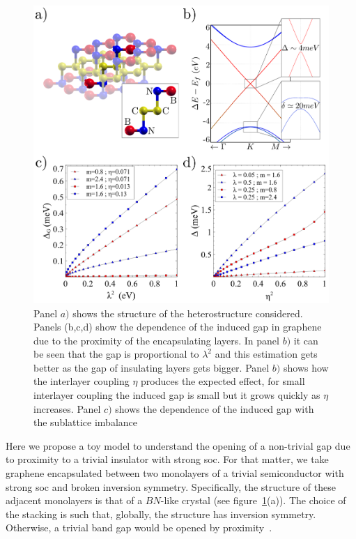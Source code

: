 \begin{figure}[hbt]
 \centering
  \includegraphics{chapter04/figures/encapsulated.png}
\caption{Panel $a)$ shows the structure of the heterostructure considered.
Panels (b,c,d) show the dependence of the induced gap in graphene due to the proximity of the encapsulating layers. In panel $b)$ it can be seen that the gap is proportional to $\lambda^{2}$ and this estimation gets better as the gap of insulating layers gets bigger. Panel $b)$ shows how the interlayer coupling $\eta$ produces the expected effect, for small interlayer coupling the induced gap is small but it grows quickly as $\eta$ increases. Panel $c)$ shows the dependence of the induced gap with the sublattice imbalance}
\label{induced}
\end{figure}

Here we propose a toy model to understand the opening of a non-trivial gap due to proximity to a trivial insulator with strong \ac{soc}.
For that matter, we take graphene encapsulated between two monolayers of a trivial semiconductor with strong \ac{soc} and broken inversion symmetry.   Specifically, the structure of  these adjacent monolayers is that of a $BN$-like crystal (see figure~\ref{induced}(a)).   The choice of the stacking is such that, globally, the structure has inversion symmetry. Otherwise,  a trivial band gap would be opened by proximity~\cite{Giovannetti2007}.

